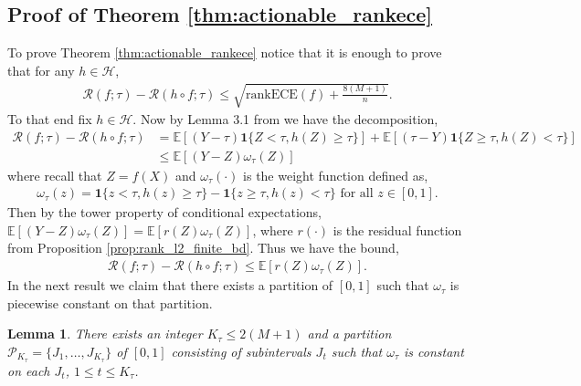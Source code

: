 \documentclass[11pt]{article}
\numberwithin{equation}{section}
\newtheorem{lemma}{Lemma}[section]
\theoremstyle{definition}
\newcommand{\E}{\mathbb{E}}
\newcommand{\cH}{\mathcal{H}}
\newcommand{\cP}{\mathcal{P}}
\newcommand{\cR}{\mathcal{R}}
\newcommand{\one}{\bm{1}}
\newcommand{\rankECE}{\mathrm{rankECE}}
\begin{document}
\subsection{Proof of Theorem \ref{thm:actionable_rankece}}\label{sec:proofof_thm_actionable_rankece}
To prove Theorem \ref{thm:actionable_rankece} notice that it is enough to prove that for any $h\in \cH$,
\begin{align*}
    \cR(f;\tau) - \cR(h\circ f;\tau)\leq \sqrt{\rankECE(f) + \frac{8(M+1)}{n}}.
\end{align*}
To that end fix $h\in \cH$. Now by Lemma 3.1 from \cite{rossellini2025can} we have the decomposition,
\begin{align*}
    \cR(f;\tau) - \cR(h\circ f; \tau) 
    & = \E\left[(Y-\tau)\one\{Z<\tau, h(Z)\geq \tau\}\right] + \E\left[(\tau-Y)\one\{Z\geq \tau, h(Z)< \tau\}\right]\\
    & \leq \E[(Y-Z)\omega_\tau(Z)]
\end{align*}
where recall that $Z = f(X)$ and $\omega_\tau(\cdot)$ is the weight function defined as,
\begin{align}\label{eq:def_omega}
    \omega_\tau(z) = \one\{z<\tau, h(z)\geq \tau\} - \one\{z\geq\tau, h(z)<\tau\}\text{ for all }z\in [0,1].
\end{align}
Then by the tower property of conditional expectations, $\E[(Y-Z)\omega_\tau(Z)] = \E[r(Z)\omega_\tau(Z)]$, where $r(\cdot)$ is the residual function from Proposition \ref{prop:rank_l2_finite_bd}. Thus we have the bound,
\begin{align*}
    \cR(f;\tau) - \cR(h\circ f; \tau) \leq \E[r(Z)\omega_\tau(Z)].
\end{align*}
In the next result we claim that there exists a partition of $[0,1]$ such that $\omega_\tau$ is piecewise constant on that partition. 

\begin{lemma}\label{lemma:partition_omega}
    There exists an integer $K_\tau \leq 2(M+1)$ and a partition $\cP_{K_\tau} = \{J_1,\ldots,J_{K_\tau}\}$ of $[0,1]$ consisting of subintervals $J_t$ such that $\omega_\tau$ is constant on each $J_t$, $1 \leq t \leq K_\tau$.
\end{lemma}
\end{document}
